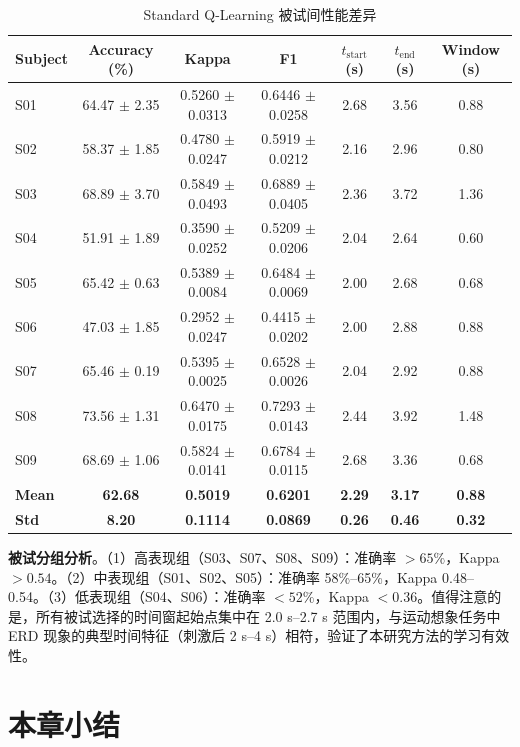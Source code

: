 \begin{table}[H]
\centering
\caption{Standard Q-Learning 被试间性能差异}
\label{tab:subject_variability}
\footnotesize
\begin{tabular}{lcccccc}
\hline
\textbf{Subject} & \textbf{Accuracy (\%)} & \textbf{Kappa} & \textbf{F1} & \textbf{$t_{\text{start}}$ (s)} & \textbf{$t_{\text{end}}$ (s)} & \textbf{Window (s)} \\
\hline
S01 & 64.47 $\pm$ 2.35 & 0.5260 $\pm$ 0.0313 & 0.6446 $\pm$ 0.0258 & 2.68 & 3.56 & 0.88 \\
S02 & 58.37 $\pm$ 1.85 & 0.4780 $\pm$ 0.0247 & 0.5919 $\pm$ 0.0212 & 2.16 & 2.96 & 0.80 \\
S03 & 68.89 $\pm$ 3.70 & 0.5849 $\pm$ 0.0493 & 0.6889 $\pm$ 0.0405 & 2.36 & 3.72 & 1.36 \\
S04 & 51.91 $\pm$ 1.89 & 0.3590 $\pm$ 0.0252 & 0.5209 $\pm$ 0.0206 & 2.04 & 2.64 & 0.60 \\
S05 & 65.42 $\pm$ 0.63 & 0.5389 $\pm$ 0.0084 & 0.6484 $\pm$ 0.0069 & 2.00 & 2.68 & 0.68 \\
S06 & 47.03 $\pm$ 1.85 & 0.2952 $\pm$ 0.0247 & 0.4415 $\pm$ 0.0202 & 2.00 & 2.88 & 0.88 \\
S07 & 65.46 $\pm$ 0.19 & 0.5395 $\pm$ 0.0025 & 0.6528 $\pm$ 0.0026 & 2.04 & 2.92 & 0.88 \\
S08 & 73.56 $\pm$ 1.31 & 0.6470 $\pm$ 0.0175 & 0.7293 $\pm$ 0.0143 & 2.44 & 3.92 & 1.48 \\
S09 & 68.69 $\pm$ 1.06 & 0.5824 $\pm$ 0.0141 & 0.6784 $\pm$ 0.0115 & 2.68 & 3.36 & 0.68 \\
\hline
\textbf{Mean} & \textbf{62.68} & \textbf{0.5019} & \textbf{0.6201} & \textbf{2.29} & \textbf{3.17} & \textbf{0.88} \\
\textbf{Std} & \textbf{8.20} & \textbf{0.1114} & \textbf{0.0869} & \textbf{0.26} & \textbf{0.46} & \textbf{0.32} \\
\hline
\end{tabular}
\end{table}

\textbf{被试分组分析}。（1）高表现组（S03、S07、S08、S09）：准确率 $> 65\%$，Kappa $> 0.54$。（2）中表现组（S01、S02、S05）：准确率 58\%--65\%，Kappa 0.48--0.54。（3）低表现组（S04、S06）：准确率 $< 52\%$，Kappa $< 0.36$。值得注意的是，所有被试选择的时间窗起始点集中在 2.0 s--2.7 s 范围内，与运动想象任务中 ERD 现象的典型时间特征（刺激后 2 s--4 s）相符\cite{pfurtscheller1999event}，验证了本研究方法的学习有效性。

\section{本章小结}

